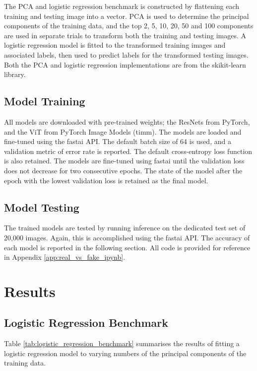 The PCA and logistic regression benchmark is constructed by flattening each training and testing image into a vector. PCA is used to determine the principal components of the training data, and the top 2, 5, 10, 20, 50 and 100 components are used in separate trials to transform both the training and testing images. A logistic regression model is fitted to the transformed training images and associated labels, then used to predict labels for the transformed testing images. Both the PCA and logistic regression implementations are from the skikit-learn library.

\subsection{Model Training}

All models are downloaded with pre-trained weights; the ResNets from PyTorch, and the ViT from PyTorch Image Models (timm). The models are loaded and fine-tuned using the fastai API. The default batch size of 64 is used, and a validation metric of error rate is reported. The default cross-entropy loss function is also retained. The models are fine-tuned using fastai until the validation loss does not decrease for two consecutive epochs. The state of the model after the epoch with the lowest validation loss is retained as the final model.

\subsection{Model Testing}

The trained models are tested by running inference on the dedicated test set of 20,000 images. Again, this is accomplished using the fastai API. The accuracy of each model is reported in the following section. All code is provided for reference in Appendix \ref{app:real_vs_fake_ipynb}.

\section{Results}

\subsection{Logistic Regression Benchmark}

Table \ref{tab:logistic_regression_benchmark} summarises the results of fitting a logistic regression model to varying numbers of the principal components of the training data.


